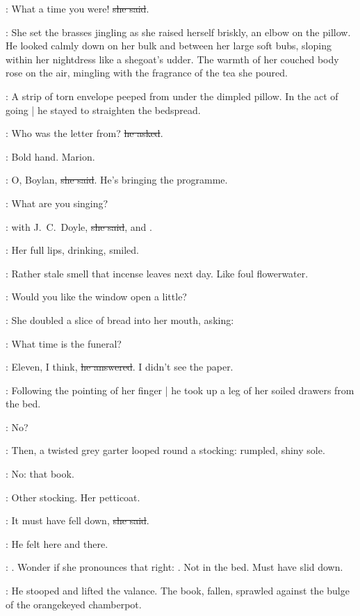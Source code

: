 \Molly:
What a time you were!
\sout{she said}.

:
She set the brasses jingling as she raised herself briskly,
an elbow on the pillow.
He looked calmly down on her bulk and between her large soft bubs,
sloping within her nightdress like a shegoat's udder.
The warmth of her couched body rose on the air,
mingling with the fragrance of the tea she poured.

:
A strip of torn envelope peeped from under the dimpled pillow.
In the act of going |
he stayed to straighten the bedspread.

\Bloom:
Who was the letter from?
\sout{he asked}.

\BloomInt:
Bold hand. Marion.

\Molly:
O, Boylan,
\sout{she said}.
He's bringing the programme.

\Bloom:
What are you singing?

\Molly:
 with J.~C.~Doyle,
\sout{she said},
and .

:
Her full lips, drinking, smiled.

\BloomInt:
Rather stale smell that incense leaves next day.
Like foul flowerwater.

\Bloom:
Would you like the window open a little?

:
She doubled a slice of bread into her mouth, asking:

\Molly:
What time is the funeral?

\Bloom:
Eleven, I think,
\sout{he answered}.
I didn't see the paper.

:
Following the pointing of her finger |
he took up a leg of her soiled drawers from the bed.

\BloomInt:
No?

:
Then, a twisted grey garter looped round a stocking:
rumpled, shiny sole.

\Molly:
No: that book.

\BloomInt:
Other stocking.
Her petticoat.

\Molly:
It must have fell down,
\sout{she said}.

:
He felt here and there.

\BloomInt:
.
Wonder if she pronounces that right:
.
Not in the bed.
Must have slid down.

:
He stooped and lifted the valance.
The book,
fallen,
sprawled against the bulge of the
orangekeyed chamberpot.

